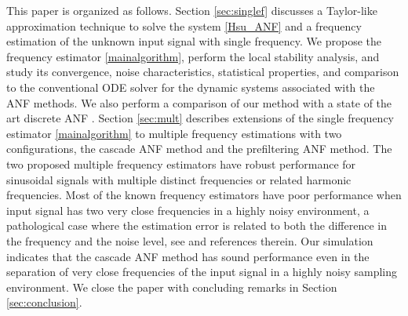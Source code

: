 \documentclass{UCF_ETD}
\begin{document}


 This paper is organized as follows. Section \ref{sec:singlef} discusses a Taylor-like approximation technique to solve the system \eqref{Hsu_ANF}  and  a  frequency estimation of the unknown input signal with single frequency.
We propose the frequency estimator \eqref{mainalgorithm}, perform the local stability analysis,
and  study its convergence, noise characteristics,  statistical properties, and comparison to the conventional
  ODE solver for the dynamic systems associated with the ANF methods. We also perform a comparison of our method with a state of the art discrete ANF \cite{tanjiang09}.  %
Section \ref{sec:mult} describes extensions
   of the single frequency estimator \eqref{mainalgorithm}
      to multiple frequency estimations with two configurations,
      the cascade ANF method and the prefiltering ANF method.
 The two proposed multiple frequency estimators have  robust performance for  sinusoidal signals with  multiple distinct frequencies or related harmonic frequencies.
Most of the known frequency estimators have poor performance
when input signal has two very close frequencies in a highly noisy environment, a pathological case where the estimation error is related to both the difference in the frequency and the noise level, see \cite{Shahram05} and references therein.
Our simulation indicates that the cascade ANF method
has sound performance even in the separation of very close frequencies of the input signal in a highly noisy sampling environment.
We close the paper with concluding remarks in Section \ref{sec:conclusion}.
\end{document}
